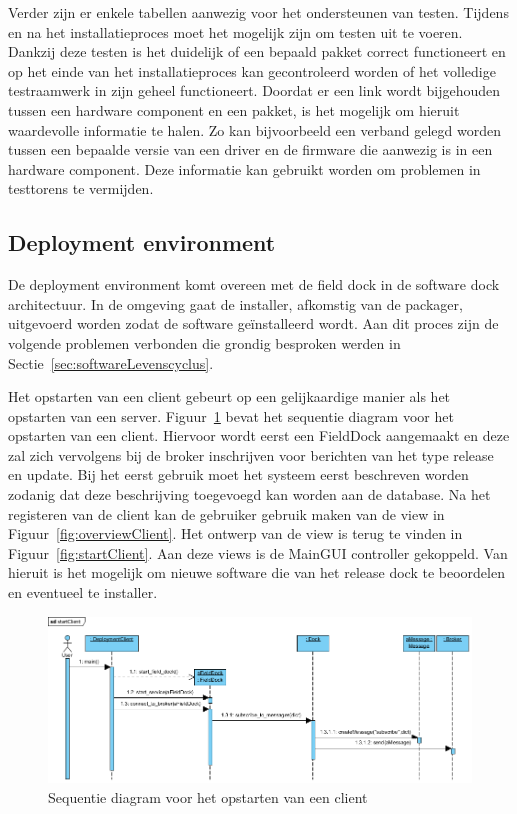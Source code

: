Verder zijn er enkele tabellen aanwezig voor het ondersteunen van testen.
Tijdens en na het installatieproces moet het mogelijk zijn om testen uit te voeren.
Dankzij deze testen is het duidelijk of een bepaald pakket correct functioneert en op het einde van het installatieproces kan gecontroleerd worden of het volledige testraamwerk in zijn geheel functioneert.
Doordat er een link wordt bijgehouden tussen een hardware component en een pakket, is het mogelijk om hieruit waardevolle informatie te halen.
Zo kan bijvoorbeeld een verband gelegd worden tussen een bepaalde versie van een driver en de firmware die aanwezig is in een hardware component.
Deze informatie kan gebruikt worden om problemen in testtorens te vermijden.

\subsection{Deployment environment}
De deployment environment komt overeen met de field dock in de software dock architectuur.
In de omgeving gaat de installer, afkomstig van de packager, uitgevoerd worden zodat de software geïnstalleerd wordt.
Aan dit proces zijn de volgende problemen verbonden die grondig besproken werden in Sectie~\ref{sec:softwareLevenscyclus}.

Het opstarten van een client gebeurt op een gelijkaardige manier als het opstarten van een server.
Figuur~\ref{fig:seqClient} bevat het sequentie diagram voor het opstarten van een client.
Hiervoor wordt eerst een FieldDock aangemaakt en deze zal zich vervolgens bij de broker inschrijven voor berichten van het type release en update.
Bij het eerst gebruik moet het systeem eerst beschreven worden zodanig dat deze beschrijving toegevoegd kan worden aan de database.
Na het registeren van de client kan de gebruiker gebruik maken van de view in Figuur~\ref{fig:overviewClient}.
Het ontwerp van de view is terug te vinden in Figuur~\ref{fig:startClient}.
Aan deze views is de MainGUI controller gekoppeld.
Van hieruit is het mogelijk om nieuwe software die van het release dock te beoordelen en eventueel te installer.

\begin{figure}
\includegraphics[width=\textwidth,height=\textheight,keepaspectratio]{afbeelding/seqStartClient.png}
\centering
\caption{Sequentie diagram voor het opstarten van een client}
\label{fig:seqClient}
\end{figure}

